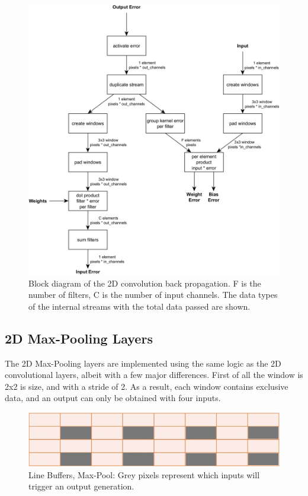 \begin{figure}[H]
    \centering
        \includegraphics[width=1\textwidth]{Images/block_diagrams/conv2d_bp_cg_mc.png}
        \decoRule
        \caption[Conv2D back propagation block diagram]{Block diagram of the 2D convolution back propagation. F is the number of filters, C is the number of input channels. The data types of the internal streams with the total data passed are shown. }
        \label{fig: Conv2D back propagation block diagram}
\end{figure}

\subsection{2D Max-Pooling Layers}
The 2D Max-Pooling layers are implemented using the same logic as the 2D convolutional layers, albeit with a few major differences. First of all the window is 2x2 is size, and with a stride of 2. As a result, each window contains exclusive data, and an output can only be obtained with four inputs.

\begin{figure}[H]
    \centering
        \includegraphics[width=1\textwidth]{Images/diagrams/line_buf_maxp.png}
        \decoRule
        \caption[Line Buffers, Max-Pool]{Line Buffers, Max-Pool: Grey pixels represent which inputs will trigger an output generation.}
        \label{fig: Line Buffers Max-Pool}
\end{figure}

